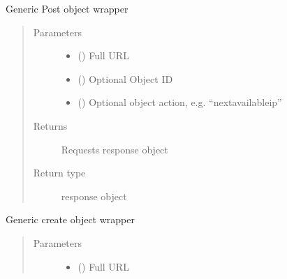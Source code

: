 \documentclass[letterpaper,10pt,english]{sphinxmanual}
\begin{document}
\begin{fulllineitems}
\begin{fulllineitems}
\label{\detokenize{code:bloxone.bloxone.b1.post}}
\sphinxAtStartPar
Generic Post object wrapper
\begin{quote}\begin{description}
\item[{Parameters}] \leavevmode\begin{itemize}
\item {} 
\sphinxAtStartPar
{} () \textendash{} Full URL

\item {} 
\sphinxAtStartPar
{} () \textendash{} Optional Object ID

\item {} 
\sphinxAtStartPar
{} () \textendash{} Optional object action, e.g. “nextavailableip”

\end{itemize}

\item[{Returns}] \leavevmode
\sphinxAtStartPar
Requests response object

\item[{Return type}] \leavevmode
\sphinxAtStartPar
response object

\end{description}\end{quote}

\end{fulllineitems}


\begin{fulllineitems}
\label{\detokenize{code:bloxone.bloxone.b1.replace}}
\sphinxAtStartPar
Generic create object wrapper
\begin{quote}\begin{description}
\item[{Parameters}] \leavevmode\begin{itemize}
\item {} 
\sphinxAtStartPar
{} () \textendash{} Full URL


\end{itemize}
\end{description}
\end{quote}
\end{fulllineitems}
\end{fulllineitems}
\end{document}
